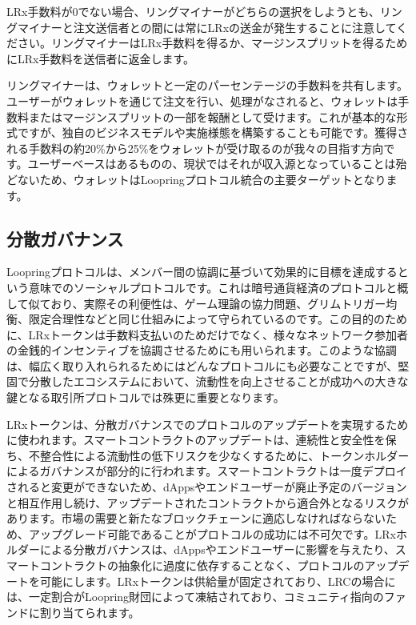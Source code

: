 \documentclass{article}
\begin{document}
\begin{multicols}{2}
LRx手数料が0でない場合、リングマイナーがどちらの選択をしようとも、リングマイナーと注文送信者との間には常にLRxの送金が発生することに注意してください。リングマイナーはLRx手数料を得るか、マージンスプリットを得るためにLRx手数料を送信者に返金します。

リングマイナーは、ウォレットと一定のパーセンテージの手数料を共有します。ユーザーがウォレットを通じて注文を行い、処理がなされると、ウォレットは手数料またはマージンスプリットの一部を報酬として受けます。これが基本的な形式ですが、独自のビジネスモデルや実施様態を構築することも可能です。獲得される手数料の約20\%から25\%をウォレットが受け取るのが我々の目指す方向です。ユーザーベースはあるものの、現状ではそれが収入源となっていることは殆どないため、ウォレットはLoopringプロトコル統合の主要ターゲットとなります。

\subsection{分散ガバナンス}
Loopringプロトコルは、メンバー間の協調に基づいて効果的に目標を達成するという意味でのソーシャルプロトコルです。これは暗号通貨経済のプロトコルと概して似ており、実際その利便性は、ゲーム理論の協力問題\cite{vitalikgovernance}、グリムトリガー均衡、限定合理性などと同じ仕組みによって守られているのです。この目的のために、LRxトークンは手数料支払いのためだけでなく、様々なネットワーク参加者の金銭的インセンティブを協調させるためにも用いられます。このような協調は、幅広く取り入れられるためにはどんなプロトコルにも必要なことですが、堅固で分散したエコシステムにおいて、流動性を向上させることが成功への大きな鍵となる取引所プロトコルでは殊更に重要となります。

LRxトークンは、分散ガバナンスでのプロトコルのアップデートを実現するために使われます。スマートコントラクトのアップデートは、連続性と安全性を保ち、不整合性による流動性の低下リスクを少なくするために、トークンホルダーによるガバナンスが部分的に行われます。スマートコントラクトは一度デプロイされると変更ができないため、dAppsやエンドユーザーが廃止予定のバージョンと相互作用し続け、アップデートされたコントラクトから適合外となるリスクがあります。市場の需要と新たなブロックチェーンに適応しなければならないため、アップグレード可能であることがプロトコルの成功には不可欠です。LRxホルダーによる分散ガバナンスは、dAppsやエンドユーザーに影響を与えたり、スマートコントラクトの抽象化に過度に依存することなく、プロトコルのアップデートを可能にします。LRxトークンは供給量が固定されており、LRCの場合には、一定割合がLoopring財団によって凍結されており、コミュニティ指向のファンドに割り当てられます\cite{LRCtokendoc}。


\end{multicols}
\end{document}

